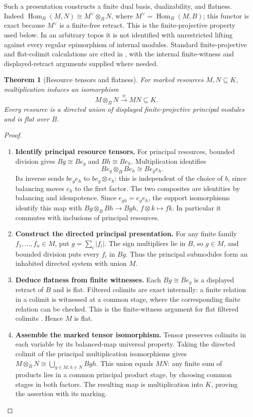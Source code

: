 \documentclass[11pt,a4paper]{article}
\numberwithin{algorithm}{section}
\numberwithin{equation}{section}
\newtheorem{theorem}{Theorem}[section]
\theoremstyle{definition}
\theoremstyle{remark}
\theoremstyle{plain}
\newcommand{\Hom}{\operatorname{Hom}}
\newcommand{\abs}[1]{\lvert #1\rvert}
\theoremstyle{definition}
\theoremstyle{plain}
\begin{document}
 Such a presentation constructs a finite dual
basis, dualizability, and flatness. Indeed
$\Hom_B(M,N)\cong M^\vee\otimes_BN$, where $M^\vee=\Hom_B(M,B)$;
this functor is exact because $M^\vee$ is a finite-free retract.
This is the finite-projective property used below. In an arbitrary
topos it is not identified with unrestricted lifting against every
regular epimorphism of internal modules. Standard finite-projective
and flat-colimit calculations are cited in \citep{Stacks}, with the
internal finite-witness and displayed-retract arguments supplied where
needed.

\begin{theorem}[Resource tensors and flatness]\label{thm:resource-tensor}
For marked resources $M,N\subseteq K$, multiplication induces an
isomorphism
\[
 M\otimes_BN\xrightarrow{\ \cong\ }MN\subseteq K.
\]
Every resource is a directed union of displayed finite-projective
principal modules and is flat over $B$.
\end{theorem}
\begin{proof}\leavevmode
\begin{enumerate}[leftmargin=*,align=left]
\item \textbf{Identify principal resource tensors.}
For principal resources, bounded division gives $Bg\cong Be_g$ and
$Bh\cong Be_h$. Multiplication identifies
\[
 Be_g\otimes_BBe_h\cong Be_ge_h.
\]
Its inverse sends $be_ge_h$ to $be_g\otimes e_h$: this is independent
of the choice of $b$, since balancing moves $e_h$ to the first factor.
The two composites are identities by balancing and idempotence.
Since $e_{gh}=e_ge_h$, the support isomorphisms identify this map with
$Bg\otimes_BBh\to Bgh$, $f\otimes k\mapsto fk$.
In particular it commutes with inclusions of principal resources.

\item \textbf{Construct the directed principal presentation.}
For any finite family $f_1,\ldots,f_n\in M$, put
$g=\sum_i\abs{f_i}$. The sign multipliers lie in $B$, so $g\in M$,
and bounded division puts every $f_i$ in $Bg$. Thus the principal
submodules form an inhabited directed system with union $M$.

\item \textbf{Deduce flatness from finite witnesses.}
Each $Bg\cong Be_g$ is a displayed retract of $B$ and is flat.
Filtered colimits are exact internally: a finite relation in a colimit
is witnessed at a common stage, where the corresponding finite relation
can be checked. This is the finite-witness argument for flat filtered
colimits \citep[Tag~05UT]{Stacks}. Hence $M$ is flat.

\item \textbf{Assemble the marked tensor isomorphism.}
Tensor preserves colimits in each variable by its balanced-map universal
property. Taking the directed colimit of the principal multiplication
isomorphisms gives $M\otimes_BN\cong\bigcup_{g\in M,h\in N}Bgh$.
This union equals $MN$: any finite sum of products lies in a common
principal product stage, by choosing common stages in both factors.
The resulting map is multiplication into $K$, proving the assertion
with its marking.
\end{enumerate}
\end{proof}
\end{document}
